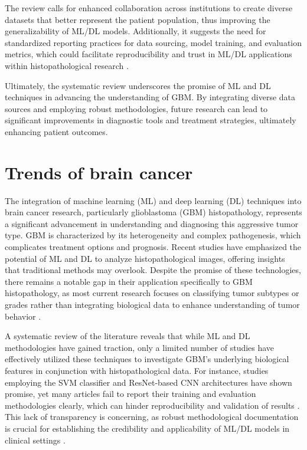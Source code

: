 \documentclass[runningheads]{llncs}
\begin{document}
The review calls for enhanced collaboration across institutions to create diverse datasets that better represent the patient population, thus improving the generalizability of ML/DL models. Additionally, it suggests the need for standardized reporting practices for data sourcing, model training, and evaluation metrics, which could facilitate reproducibility and trust in ML/DL applications within histopathological research \cite{18, 22, 39}.

Ultimately, the systematic review underscores the promise of ML and DL techniques in advancing the understanding of GBM. By integrating diverse data sources and employing robust methodologies, future research can lead to significant improvements in diagnostic tools and treatment strategies, ultimately enhancing patient outcomes.
\section{Trends of brain cancer}
The integration of machine learning (ML) and deep learning (DL) techniques into brain cancer research, particularly glioblastoma (GBM) histopathology, represents a significant advancement in understanding and diagnosing this aggressive tumor type. GBM is characterized by its heterogeneity and complex pathogenesis, which complicates treatment options and prognosis. Recent studies have emphasized the potential of ML and DL to analyze histopathological images, offering insights that traditional methods may overlook. Despite the promise of these technologies, there remains a notable gap in their application specifically to GBM histopathology, as most current research focuses on classifying tumor subtypes or grades rather than integrating biological data to enhance understanding of tumor behavior \cite{Chun_2025}.

A systematic review of the literature reveals that while ML and DL methodologies have gained traction, only a limited number of studies have effectively utilized these techniques to investigate GBM's underlying biological features in conjunction with histopathological data. For instance, studies employing the SVM classifier and ResNet-based CNN architectures have shown promise, yet many articles fail to report their training and evaluation methodologies clearly, which can hinder reproducibility and validation of results \cite{Chun_2025}. This lack of transparency is concerning, as robust methodological documentation is crucial for establishing the credibility and applicability of ML/DL models in clinical settings \cite{Chun_2025}.
\end{document}
